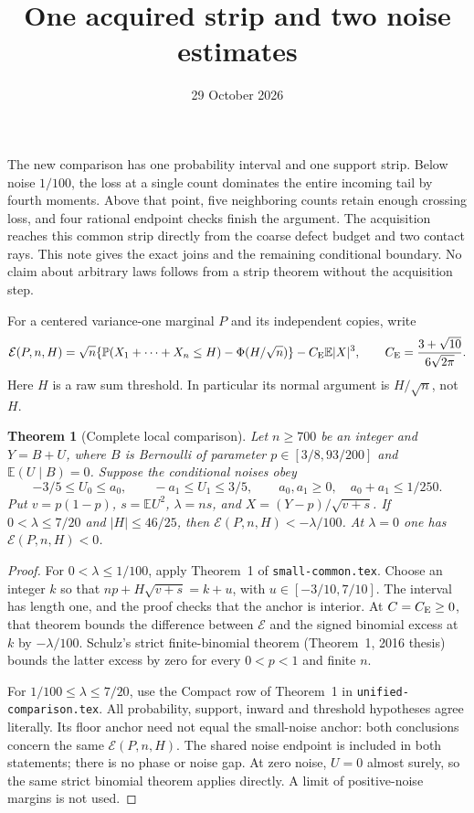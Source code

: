 \documentclass[11pt]{article}
\title{One acquired strip and two noise estimates}
\author{}\date{29 October 2026}
\newcommand{\E}{\mathbb E}\newcommand{\Pp}{\mathbb P}
\newcommand{\CE}{C_{\rm E}}
\newtheorem{theorem}{Theorem}\newtheorem{corollary}[theorem]{Corollary}
\begin{document}
\maketitle

The new comparison has one probability interval and one support strip.
Below noise $1/100$, the loss at a single count dominates the entire incoming
tail by fourth moments. Above that point, five neighboring counts retain
enough crossing loss, and four rational endpoint checks finish the argument.
The acquisition reaches this common strip directly from the coarse defect
budget and two contact rays. This note gives the exact joins and the remaining
conditional boundary. No claim about arbitrary laws follows from a strip
theorem without the acquisition step.

For a centered variance-one marginal $P$ and its independent copies, write
\[
\mathcal E(P,n,H)=\sqrt n\{\Pp(X_1+\cdots+X_n\le H)
                         -\Phi(H/\sqrt n)\}-\CE\E|X|^3,
\qquad \CE=\frac{3+\sqrt{10}}{6\sqrt{2\pi}}.
\]
Here $H$ is a raw sum threshold. In particular its normal argument is
$H/\sqrt n$, not $H$.

\begin{theorem}[Complete local comparison]\label{th:local}
Let $n\ge700$ be an integer and $Y=B+U$, where $B$ is Bernoulli of parameter
$p\in[3/8,93/200]$ and $\E(U\mid B)=0$. Suppose the conditional noises obey
\[
 -3/5\le U_0\le a_0,\qquad -a_1\le U_1\le3/5,\qquad
 a_0,a_1\ge0,\quad a_0+a_1\le1/250.
\]
Put $v=p(1-p)$, $s=\E U^2$, $\lambda=ns$, and
$X=(Y-p)/\sqrt{v+s}$. If $0<\lambda\le7/20$ and $|H|\le46/25$, then
$\mathcal E(P,n,H)<-\lambda/100$. At $\lambda=0$ one has
$\mathcal E(P,n,H)<0$.
\end{theorem}
\begin{proof}
For $0<\lambda\le1/100$, apply Theorem~1 of
\texttt{small-common.tex}. Choose an integer $k$ so that
$np+H\sqrt{v+s}=k+u$, with $u\in[-3/10,7/10]$.
The interval has length one, and the proof checks that the anchor is interior.
At $C=\CE\ge0$, that theorem bounds the difference between $\mathcal E$
and the signed binomial excess at $k$ by $-\lambda/100$.
Schulz's strict finite-binomial theorem (Theorem~1, 2016 thesis) bounds the
latter excess by zero for every $0<p<1$ and finite $n$.

For $1/100\le\lambda\le7/20$, use the Compact row of Theorem~1 in
\texttt{unified-comparison.tex}. All probability, support, inward and threshold
hypotheses agree literally. Its floor anchor need not equal the small-noise
anchor: both conclusions concern the same $\mathcal E(P,n,H)$.
The shared noise endpoint is included in both statements; there is no phase
or noise gap. At zero noise, $U=0$ almost surely, so the same strict binomial
theorem applies directly. A limit of positive-noise margins is not used.
\end{proof}
\end{document}
